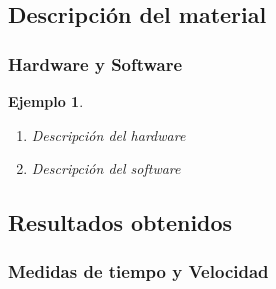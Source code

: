 \documentclass{beamer}
\newtheorem{ejemplo}{Ejemplo}
\begin{document}
\subsection{Descripción del material}
\begin{frame}
\frametitle{Hardware y Software}

\begin{ejemplo}
  \begin{enumerate}
    \item
      Descripción del hardware 
      \pause

    \item
      Descripción del software 
  \end{enumerate}
\end{ejemplo}

\end{frame}

\subsection{Resultados obtenidos}
\begin{frame}
\frametitle{Medidas de tiempo y Velocidad}



\end{frame}
\end{document}
